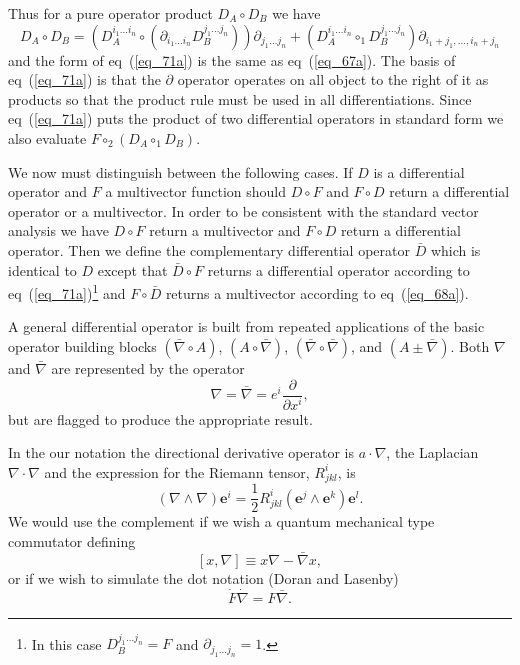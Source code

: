 \documentclass[12pt]{report}
\newcommand{\bm}[1]{\boldsymbol{#1}}
\newcommand{\bfrac}[2]{\displaystyle\frac{#1}{#2}}
\newcommand{\lp}{\left (}
\newcommand{\rp}{\right )}
\newcommand{\half}{\frac{1}{2}}
\newcommand{\pdiff}[2]{\bfrac{\partial {#1}}{\partial {#2}}}
\newcommand{\W}{\wedge}
\newcommand{\lbrk}{\left [}
\newcommand{\rbrk}{\right ]}
\newcommand{\com}[1]{\lbrk {#1} \rbrk}
\newcommand{\paren}[1]{\lp {#1} \rp}
\newcommand{\be}{\begin{equation}}
\newcommand{\ee}{\end{equation}}
\newcommand{\eb}{\bm{e}}
\begin{document}
Thus for a pure operator product $D_{A}\circ D_{B}$ we have
\be\label{eq_71a}
    D_{A}\circ D_{B} = \paren{D_{A}^{i_{1}\dots i_{n}}\circ\paren{\partial_{i_{1}\dots i_{n}}D_{B}^{j_{1}\dots j_{n}}}}
                                             \partial_{j_{1}\dots j_{n}}+
                                             \paren{D_{A}^{i_{1}\dots i_{n}}\circ_{1}D_{B}^{j_{1}\dots j_{n}}}
                                             \partial_{i_{1}+j_{1},\dots, i_{n}+j_{n}}
\ee
and the form of eq~(\ref{eq_71a}) is the same as eq~(\ref{eq_67a}).  The basis of eq~(\ref{eq_71a}) is that the $\partial$ operator
operates on all object to the right of it as products so that the product rule must be used in all differentiations.  Since eq~(\ref{eq_71a})
puts the product of two differential operators in standard form we also evaluate $F\circ_{2}\paren{D_{A}\circ_{1}D_{B}}$.

We now must distinguish between the following cases.  If $D$ is a differential operator and $F$ a multivector function should $D\circ F$ and
$F\circ D$ return a differential operator or a multivector. In order to be consistent with the standard vector analysis we have $D\circ F$
return a multivector and $F\circ D$ return a differential operator.  Then we define the complementary differential operator $\bar{D}$ which
is identical to $D$ except that $\bar{D}\circ F$ returns a differential operator according to eq~(\ref{eq_71a})\footnote{In this case
$D_{B}^{j_{1}\dots j_{n}} = F$ and $\partial_{j_{1}\dots j_{n}} = 1$.} and $F\circ\bar{D}$ returns a multivector according to eq~(\ref{eq_68a}).

A general differential operator is built from repeated applications of the basic operator building blocks $\paren{\bar{\nabla}\circ A}$,
$\paren{A\circ\bar{\nabla}}$, $\paren{\bar{\nabla}\circ\bar{\nabla}}$, and $\paren{A\pm \bar{\nabla}}$.  Both $\nabla$ and  $\bar{\nabla}$
are represented by the operator
\be
    \nabla = \bar{\nabla} = e^{i}\pdiff{}{x^{i}},
\ee
but are flagged to produce the appropriate result.

In the our notation the directional derivative operator is $a\cdot\nabla$, the Laplacian
$\nabla\cdot\nabla$ and the expression for the Riemann tensor, $R^{i}_{jkl}$, is
\be
    \paren{\nabla\W\nabla}\eb^{i} = \half R^{i}_{jkl}\paren{\eb^{j}\W\eb^{k}}\eb^{l}.
\ee
We would use the complement if we wish a quantum mechanical type commutator defining
\be
    \com{x,\nabla} \equiv x\nabla - \bar{\nabla}x,
\ee
or if we wish to simulate the dot notation (Doran and Lasenby)
\be
    \dot{F}\dot{\nabla} = F\bar{\nabla}.
\ee
\end{document}
